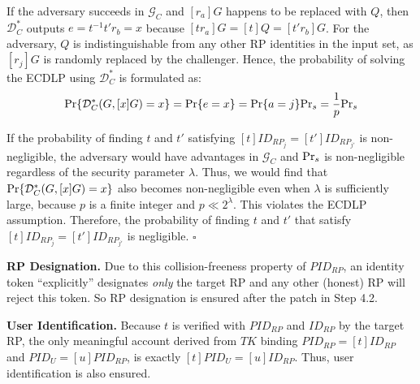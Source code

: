 If the adversary succeeds in $\mathcal{G}_C$ and $[r_a]G$ happens to be replaced with $Q$, then $\mathcal{D}^*_C$ outputs $e=t^{-1}t'r_b =x$ because $[tr_a]G = [t]Q = [t'r_b]G$. For the adversary, $Q$ is indistinguishable from any other RP identities in the input set, as $[r_j]G$ is randomly replaced by the challenger.
Hence, the probability of solving the ECDLP using $\mathcal{D}^*_C$ is formulated as:
\begin{equation*}
{\rm Pr}\{\mathcal{D}^*_C(G, [x]G)=x\} = {\rm Pr}\{e = x\}={\rm Pr}\{a=j\}{\rm Pr}_s=\frac{1}{p}{\rm Pr}_s
\end{equation*}

If the probability of finding $t$ and $t'$ satisfying $[t]ID_{RP_j} = [t']ID_{RP_{j'}}$ is non-negligible, the adversary would have advantages  in $\mathcal{G}_C$ and ${\rm Pr}_s$ is non-negligible regardless of the security parameter $\lambda$.
Thus, we would find that ${\rm Pr}\{\mathcal{D}^*_C(G, [x]G)=x\}$ also becomes non-negligible even when $\lambda$ is sufficiently large, because $p$ is a finite integer and $p \ll 2^\lambda$.
This violates the ECDLP assumption. Therefore, the probability of finding $t$ and $t'$ that satisfy $[t]ID_{RP_j} = [t']ID_{RP_{j'}}$ is negligible.
\hfill $\square$
\vspace{1mm}

\noindent \textbf{RP Designation.} 
Due to this collision-freeness property of $PID_{RP}$,
    an identity token ``explicitly'' designates \emph{only} the target RP and any other (honest) RP will reject this token.
So RP designation is ensured after the patch in Step 4.2.

\noindent \textbf{User Identification.} 
Because $t$ is verified with $PID_{RP}$ and $ID_{RP}$ by the target RP,
 the only meaningful account derived
from $TK$ binding $PID_{RP}=[t]ID_{RP}$ and $PID_U = [u]PID_{RP}$,
 is exactly $[t]PID_U =[u]ID_{RP}$. Thus, user identification is also ensured.

